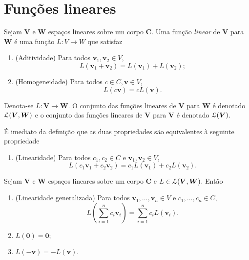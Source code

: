 \section{Funções lineares}

\begin{definition}
Sejam $\bm V$ e $\bm W$ espaços lineares sobre um corpo $\bm C$. Uma função \emph{linear} de $\bm V$ para $\bm W$ é uma função $L\colon V \to W$ que satisfaz
	\begin{enumerate}
	\item (Aditividade) Para todos $\bm v_1,\bm v_2 \in V$,
		\begin{equation*}
		L(\bm v_1 + \bm v_2) = L(\bm v_1)+L(\bm v_2);
		\end{equation*}
	\item (Homogeneidade) Para todos $c \in C, \bm v \in V$,
		\begin{equation*}
		 L(c\bm v)=cL(\bm v).
		\end{equation*}
	\end{enumerate}
Denota-se $L\colon \bm V \to \bm W$. O conjunto das funções lineares de $\bm V$ para $\bm W$ é denotado $\mathcal{L}(\bm V,\bm W)$ e o conjunto das funções lineares de $\bm V$ para $\bm V$ é denotado $\mathcal{L}(\bm V)$.
\end{definition}

	É imediato da definição que as duas propriedades são equivalentes à seguinte propriedade
	\begin{enumerate}
	\item (Linearidade) Para todos $c_1,c_2 \in C$ e $\bm v_1,\bm v_2 \in V$,
		\begin{equation*}
		L(c_1\bm v_1 + c_2\bm v_2) = c_1L(\bm v_1)+c_2L(\bm v_2).
		\end{equation*}
	\end{enumerate}

\begin{proposition}
Sejam $\bm V$ e $\bm W$ espaços lineares sobre um corpo $\bm C$ e $L \in \mathcal{L}(\bm V,\bm W)$. Então
	\begin{enumerate}
	\item (Linearidade generalizada) Para todos $\bm v_1,\ldots,\bm v_n \in V$ e $c_1,\ldots,c_n \in C$,
	\begin{equation*}
	L\left(\sum_{i=1}^n c_i \bm v_i \right) = \sum_{i=1}^n c_i L(\bm v_i).
	\end{equation*}

	\item $L(\bm 0) = \bm 0$;

	\item $L(-\bm v)=-L(\bm v)$.
\end{enumerate}
\end{proposition}

